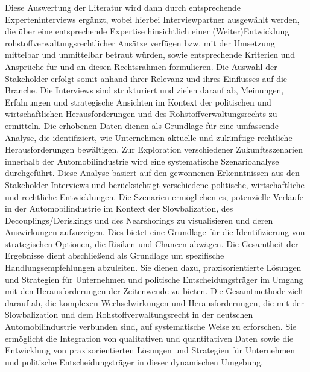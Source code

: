 \documentclass[12pt,a4paper,oneside]{book} %
\begin{document}
Diese Auswertung der Literatur wird dann durch entsprechende Experteninterviews ergänzt, wobei hierbei Interviewpartner ausgewählt werden, die über eine entsprechende Expertise hinsichtlich einer (Weiter)Entwicklung rohstoffverwaltungsrechtlicher Ansätze verfügen bzw. mit der Umsetzung mittelbar und unmittelbar betraut würden, sowie entsprechende Kriterien und Ansprüche für und an diesen Rechtsrahmen formulieren. Die Auswahl der Stakeholder erfolgt somit anhand ihrer Relevanz und ihres Einflusses auf die Branche. Die Interviews sind strukturiert und zielen darauf ab, Meinungen, Erfahrungen und strategische Ansichten im Kontext der politischen und wirtschaftlichen Herausforderungen und des Rohstoffverwaltungsrechts zu ermitteln. Die erhobenen Daten dienen als Grundlage für eine umfassende Analyse, die identifiziert, wie Unternehmen aktuelle und zukünftige rechtliche Herausforderungen bewältigen. Zur Exploration verschiedener Zukunftsszenarien innerhalb der Automobilindustrie wird eine systematische Szenarioanalyse durchgeführt. Diese Analyse basiert auf den gewonnenen Erkenntnissen aus den Stakeholder-Interviews und berücksichtigt verschiedene politische, wirtschaftliche und rechtliche Entwicklungen. Die Szenarien ermöglichen es, potenzielle Verläufe in der Automobilindustrie im Kontext der Slowbalization, des Decouplings/Deriskings und des Nearshorings zu visualisieren und deren Auswirkungen aufzuzeigen. Dies bietet eine Grundlage für die Identifizierung von strategischen Optionen, die Risiken und Chancen abwägen. Die Gesamtheit der Ergebnisse dient abschließend als Grundlage um spezifische Handlungsempfehlungen abzuleiten. Sie dienen dazu, praxisorientierte Lösungen und Strategien für Unternehmen und politische Entscheidungsträger im Umgang mit den Herausforderungen der Zeitenwende zu bieten.
Die Gesamtmethode zielt darauf ab, die komplexen Wechselwirkungen und Herausforderungen, die mit der Slowbalization und dem Rohstoffverwaltungsrecht in der deutschen Automobilindustrie verbunden sind, auf systematische Weise zu erforschen. Sie ermöglicht die Integration von qualitativen und quantitativen Daten sowie die Entwicklung von praxisorientierten Lösungen und Strategien für Unternehmen und politische Entscheidungsträger in dieser dynamischen Umgebung.
\end{document}

